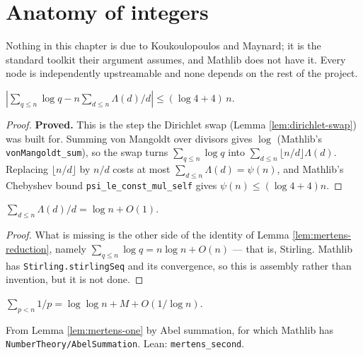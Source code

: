 \chapter{Anatomy of integers}
\label{chap:anatomy}

Nothing in this chapter is due to Koukoulopoulos and Maynard; it is the standard
toolkit their argument assumes, and Mathlib does not have it. Every node is
independently upstreamable and none depends on the rest of the project.

\begin{lemma}
  \label{lem:mertens-reduction}
  \leanok
  $\left| \sum_{q \leq n} \log q - n \sum_{d \leq n} \Lambda(d)/d \right|
   \leq (\log 4 + 4)\, n$.
\end{lemma}

\begin{proof}
  \leanok
  \textbf{Proved.} This is the step the Dirichlet swap (Lemma \ref{lem:dirichlet-swap})
  was built for. Summing von Mangoldt over divisors gives $\log$
  (Mathlib's \texttt{vonMangoldt\_sum}), so the swap turns $\sum_{q \leq n} \log q$ into
  $\sum_{d \leq n} \lfloor n/d \rfloor \Lambda(d)$. Replacing $\lfloor n/d \rfloor$ by
  $n/d$ costs at most $\sum_{d \le n} \Lambda(d) = \psi(n)$, and Mathlib's Chebyshev bound
  \texttt{psi\_le\_const\_mul\_self} gives $\psi(n) \le (\log 4 + 4)n$.
\end{proof}

\begin{lemma}
  \label{lem:mertens-one}
  \notready
  $\sum_{d \leq n} \Lambda(d)/d = \log n + O(1)$.
\end{lemma}

\begin{proof}
  What is missing is the other side of the identity of Lemma
  \ref{lem:mertens-reduction}, namely $\sum_{q \leq n} \log q = n\log n + O(n)$ --- that
  is, Stirling. Mathlib has \texttt{Stirling.stirlingSeq} and its convergence, so this is
  assembly rather than invention, but it is not done.
\end{proof}

\begin{lemma}
  \label{lem:mertens-two}
  \notready
  $\sum_{p < n} 1/p = \log\log n + M + O(1/\log n)$.

  From Lemma \ref{lem:mertens-one} by Abel summation, for which Mathlib has
  \texttt{NumberTheory/AbelSummation}. Lean: \texttt{mertens\_second}.
\end{lemma}


